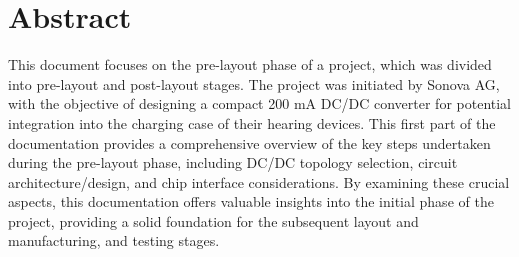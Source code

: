 \section*{\huge Abstract}
\label{chap:abstract}
This document focuses on the pre-layout phase of a project, which was divided into pre-layout and post-layout stages. The project was initiated by Sonova AG, with the objective of designing a compact 200 mA DC/DC converter for potential integration into the charging case of their hearing devices. This first part of the documentation provides a comprehensive overview of the key steps undertaken during the pre-layout phase, including DC/DC topology selection, circuit architecture/design, and chip interface considerations. By examining these crucial aspects, this documentation offers valuable insights into the initial phase of the project, providing a solid foundation for the subsequent layout and manufacturing, and testing stages.
\clearpage